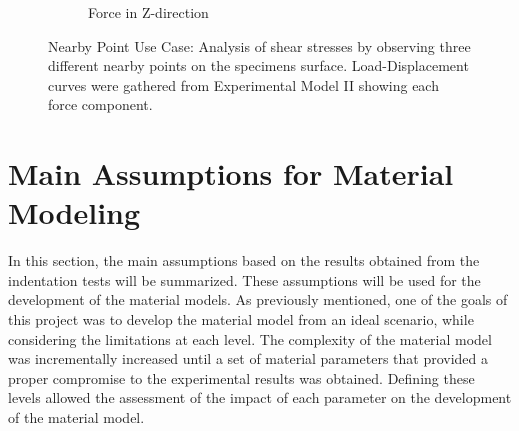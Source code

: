 \begin{figure}[htbp]
    \begin{subfigure}[b]{0.31\textwidth}
    \centering
    \caption{Force in Z-direction}
    \end{subfigure}  
    \caption[Nearby Point Use Case: Shear stresses analysis]{Nearby Point Use Case: Analysis of shear stresses by observing three different nearby points on the specimens surface. Load-Displacement curves were gathered from Experimental Model II showing each force component.}
    \label{fig:nbpexpIIgraph}
    \end{figure}

\section{Main Assumptions for Material Modeling}
\label{section:mainassumption}

In this section, the main assumptions based on the results obtained from 
the indentation tests will be summarized. These assumptions will be used for the 
development of the material models. As previously mentioned, one of the goals of this project 
was to develop the material model from an ideal scenario, while considering the limitations 
at each level. The complexity of the material model was incrementally increased until a set 
of material parameters that provided a proper compromise to the experimental results was obtained.
Defining these levels allowed the assessment of the impact of each parameter on the development of the 
material model.\\

